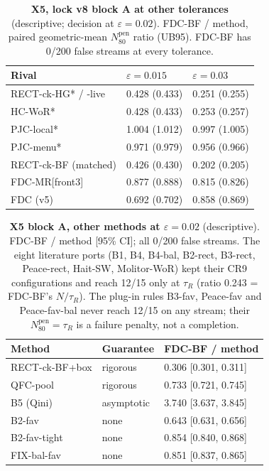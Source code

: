 \documentclass[sigconf,anonymous,review]{acmart}
\newcommand{\eps}{\varepsilon}
\newcommand{\Npen}{N_{80}^{\text{pen}}}
\begin{document}
\begin{table}[H]
\caption{\textbf{X5, lock v8 block A at other tolerances} (descriptive; decision at $\eps = 0.02$). FDC-BF / method, paired geometric-mean $\Npen$ ratio (UB95). FDC-BF has 0/200 false streams at every tolerance.}
\label{tab:x5eps}
\footnotesize
\begin{tabular}{@{}lll@{}}
\toprule
Rival & $\eps = 0.015$ & $\eps = 0.03$ \\
\midrule
RECT-ck-HG* / -live & 0.428 (0.433) & 0.251 (0.255) \\
HC-WoR* & 0.428 (0.433) & 0.253 (0.257) \\
PJC-local* & 1.004 (1.012) & 0.997 (1.005) \\
PJC-menu* & 0.971 (0.979) & 0.956 (0.966) \\
RECT-ck-BF (matched) & 0.426 (0.430) & 0.202 (0.205) \\
FDC-MR[front3] & 0.877 (0.888) & 0.815 (0.826) \\
FDC (v5) & 0.692 (0.702) & 0.858 (0.869) \\
\bottomrule
\end{tabular}
\end{table}

\begin{table}[H]
\caption{\textbf{X5 block A, other methods at $\eps = 0.02$} (descriptive). FDC-BF / method [95\% CI]; all 0/200 false streams. The eight literature ports (B1, B4, B4-bal, B2-rect, B3-rect, Peace-rect, Hait-SW, Molitor-WoR) kept their CR9 configurations and reach 12/15 only at $\tau_R$ (ratio 0.243 = FDC-BF's $N/\tau_R$). The plug-in rules B3-fav, Peace-fav and Peace-fav-bal never reach 12/15 on any stream; their $\Npen = \tau_R$ is a failure penalty, not a completion.}
\label{tab:x5other}
\footnotesize
\begin{tabular}{@{}lll@{}}
\toprule
Method & Guarantee & FDC-BF / method \\
\midrule
RECT-ck-BF+box & rigorous & 0.306 [0.301, 0.311] \\
QFC-pool & rigorous & 0.733 [0.721, 0.745] \\
B5 (Qini) & asymptotic & 3.740 [3.637, 3.845] \\
B2-fav & none & 0.643 [0.631, 0.656] \\
B2-fav-tight & none & 0.854 [0.840, 0.868] \\
FIX-bal-fav & none & 0.851 [0.837, 0.865] \\
\bottomrule
\end{tabular}
\end{table}
\end{document}
